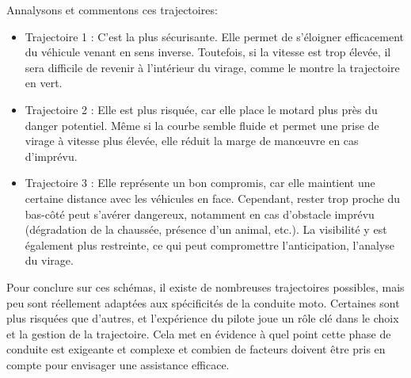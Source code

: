 Annalysons et commentons ces trajectoires:\
\begin{itemize}
    \item Trajectoire 1 : C’est la plus sécurisante. Elle permet de s’éloigner efficacement du véhicule venant en sens inverse. Toutefois, si la vitesse est trop élevée, il sera difficile de revenir à l’intérieur du virage, comme le montre la trajectoire en vert.
    \item Trajectoire 2 : Elle est plus risquée, car elle place le motard plus près du danger potentiel. Même si la courbe semble fluide et permet une prise de virage à vitesse plus élevée, elle réduit la marge de manœuvre en cas d’imprévu.
    \item Trajectoire 3 : Elle représente un bon compromis, car elle maintient une certaine distance avec les véhicules en face. Cependant, rester trop proche du bas-côté peut s’avérer dangereux, notamment en cas d’obstacle imprévu (dégradation de la chaussée, présence d’un animal, etc.). La visibilité y est également plus restreinte, ce qui peut compromettre l’anticipation, l'analyse du virage.
\end{itemize}
Pour conclure sur ces schémas, il existe de nombreuses trajectoires possibles, mais peu sont réellement adaptées aux spécificités de la conduite moto. Certaines sont plus risquées que d’autres, et l’expérience du pilote joue un rôle clé dans le choix et la gestion de la trajectoire. Cela met en évidence à quel point cette phase de conduite est exigeante et complexe et combien de facteurs doivent être pris en compte pour envisager une assistance efficace.

